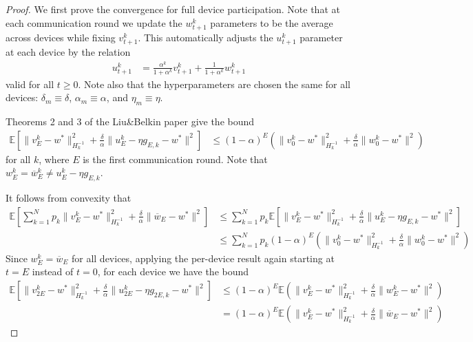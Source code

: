 	\begin{proof}
		We first prove the convergence for full device participation. Note
		that at each communication round we update the $w_{t+1}^{k}$ parameters
		to be the average across devices while fixing $v_{t+1}^{k}$. This
		automatically adjusts the $u_{t+1}^{k}$ parameter at each device
		by the relation 
		\begin{align*}
		u_{t+1}^{k} & =\frac{\alpha^{k}}{1+\alpha^{k}}v_{t+1}^{k}+\frac{1}{1+\alpha^{k}}w_{t+1}^{k}
		\end{align*}
		valid for all $t\geq0$. Note also that the hyperparameters are chosen
		the same for all devices: $\delta_{m}\equiv\delta$, $\alpha_{m}\equiv\alpha$,
		and $\eta_{m}\equiv\eta$. 
		
		Theorems 2 and 3 of the Liu\&Belkin paper give the bound 
		\begin{align*}
		\mathbb{E}\left[\|v_{E}^{k}-w^{\ast}\|_{H_{k}^{-1}}^{2}+\frac{\delta}{\alpha}\|u_{E}^{k}-\eta g_{E,k}-w^{\ast}\|^{2}\right] & \leq(1-\alpha)^{E}(\|v_{0}^{k}-w^{\ast}\|_{H_{k}^{-1}}^{2}+\frac{\delta}{\alpha}\|w_{0}^{k}-w^{\ast}\|^{2})
		\end{align*}
		for all $k$, where $E$ is the first communication round. Note that
		$w_{E}^{k}=\overline{w}_{E}^{k}\neq u_{E}^{k}-\eta g_{E,k}$.
		
		It follows from convexity that 
		\begin{align*}
		\mathbb{E}\left[\sum_{k=1}^{N}p_{k}\|v_{E}^{k}-w^{\ast}\|_{H_{k}^{-1}}^{2}+\frac{\delta}{\alpha}\|\overline{w}_{E}-w^{\ast}\|^{2}\right] & \leq\sum_{k=1}^{N}p_{k}\mathbb{E}\left[\|v_{E}^{k}-w^{\ast}\|_{H_{k}^{-1}}^{2}+\frac{\delta}{\alpha}\|u_{E}^{k}-\eta g_{E,k}-w^{\ast}\|^{2}\right]\\
		& \leq\sum_{k=1}^{N}p_{k}(1-\alpha)^{E}(\|v_{0}^{k}-w^{\ast}\|_{H_{k}^{-1}}^{2}+\frac{\delta}{\alpha}\|w_{0}^{k}-w^{\ast}\|^{2})
		\end{align*}
		Since $w_{E}^{k}=\overline{w}_{E}$ for all devices, applying the
		per-device result again starting at $t=E$ instead of $t=0$, for
		each device we have the bound
		\begin{align*}
		\mathbb{E}\left[\|v_{2E}^{k}-w^{\ast}\|_{H_{k}^{-1}}^{2}+\frac{\delta}{\alpha}\|u_{2E}^{k}-\eta g_{2E,k}-w^{\ast}\|^{2}\right] & \leq(1-\alpha)^{E}\mathbb{E}(\|v_{E}^{k}-w^{\ast}\|_{H_{k}^{-1}}^{2}+\frac{\delta}{\alpha}\|w_{E}^{k}-w^{\ast}\|^{2})\\
		& =(1-\alpha)^{E}\mathbb{E}(\|v_{E}^{k}-w^{\ast}\|_{H_{k}^{-1}}^{2}+\frac{\delta}{\alpha}\|\overline{w}_{E}-w^{\ast}\|^{2})
		\end{align*}
		

\end{proof}
